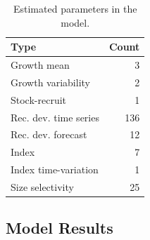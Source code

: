 \documentclass[
]{scrartcl}
\begin{document}
\endgroup

\newpage{}

\begingroup
\fontsize{9.0pt}{10.8pt}\selectfont

\begin{longtable}{lr}

\caption{\label{tbl-n-param}Estimated parameters in the model.}

\tabularnewline

\toprule
Type & Count \\ 
\midrule\addlinespace[2.5pt]
Growth mean & 3 \\ 
Growth variability & 2 \\ 
Stock-recruit & 1 \\ 
Rec. dev. time series & 136 \\ 
Rec. dev. forecast & 12 \\ 
Index & 7 \\ 
Index time-variation & 1 \\ 
Size selectivity & 25 \\ 
\bottomrule

\end{longtable}

\endgroup

\newpage{}

\subsection{Model Results}\label{model-results}
\end{document}
